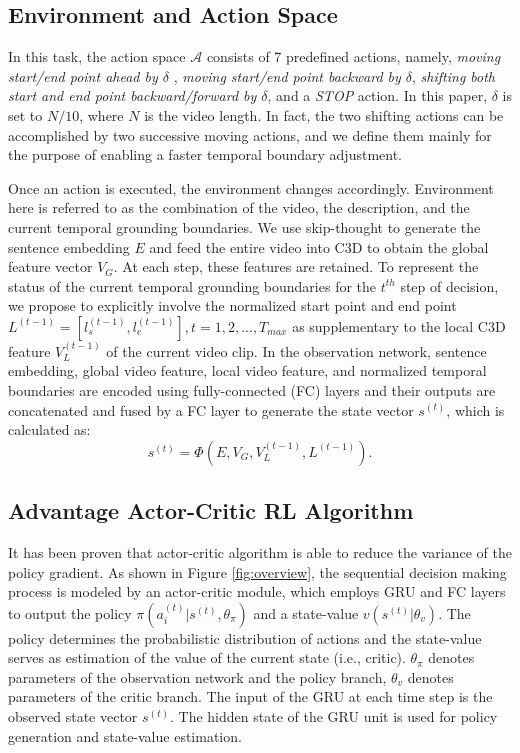 \documentclass[letterpaper]{article} %
\begin{document}
\subsection{Environment and Action Space}
In this task, the action space $\mathcal{A}$ consists of 7 predefined actions, namely, \emph{moving start/end point ahead by $\delta$ }, \emph{moving start/end point backward by $\delta$}, \emph{shifting both start and end point backward/forward by $\delta$}, and a \emph{STOP} action. In this paper, $\delta$ is set to $N/10$, where $N$ is the video length. In fact, the two shifting actions can be accomplished by two successive moving actions, and we define them mainly for the purpose of enabling a faster temporal boundary adjustment.

Once an action is executed, the environment changes accordingly.
Environment here is referred to as the combination of the video, the description, and the current temporal grounding boundaries. We use skip-thought \cite{skipthought} to generate the sentence embedding $E$ and feed the entire video into C3D \cite{c3d} to obtain the global feature vector $V_G$. At each step, these features are retained. To represent the status of the current temporal grounding boundaries for the $t^{th}$ step of decision, we propose to explicitly involve the normalized start point and end point $L^{(t-1)}=[l_s^{(t-1)}, l_e^{(t-1)}], t=1,2,...,T_{max}$ as supplementary to the local C3D feature $V_L^{(t-1)}$ of the current video clip. In the observation network, sentence embedding, global video feature, local video feature, and normalized temporal boundaries are encoded using fully-connected (FC) layers and their outputs are concatenated and fused by a FC layer to generate the state vector $s^{(t)}$, which is calculated as:
\begin{equation}
s^{(t)} = \Phi(E,V_G,V_L^{(t-1)},L^{(t-1)}).
\end{equation}

\subsection{Advantage Actor-Critic RL Algorithm}
It has been proven that actor-critic algorithm \cite{li2017deep} is able to reduce the variance of the policy gradient. As shown in Figure \ref{fig:overview}, the sequential decision making process is modeled by an actor-critic module, which employs GRU \cite{cho2014learning} and FC layers to output the policy $\pi(a_i^{(t)}|s^{(t)}, {\theta_\pi})$ and a state-value $v(s^{(t)} | \theta_v)$. The policy determines the probabilistic distribution of actions and the state-value serves as estimation of the value of the current state (i.e., critic). $\theta_\pi$ denotes parameters of the observation network and the policy branch, $\theta_v$ denotes parameters of the critic branch. The input of the GRU at each time step is the observed state vector $s^{(t)}$. The hidden state of the GRU unit is used for policy generation and state-value estimation.
\end{document}
